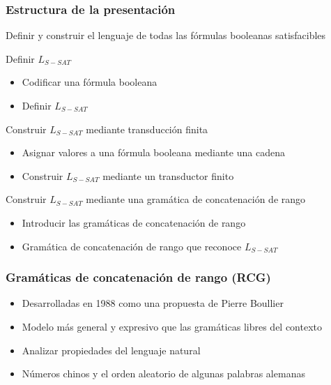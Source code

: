 \documentclass{beamer}
\begin{document}
\begin{frame}
    \frametitle{Estructura de la presentación}
    
    Definir y construir el lenguaje de todas las fórmulas booleanas satisfacibles   
    
    
    \begin{block}{Definir $L_{S-SAT}$}
        \begin{itemize}
            \item Codificar una fórmula booleana
            \item Definir $L_{S-SAT}$
        \end{itemize}
    \end{block}
    
    \begin{block}{Construir $L_{S-SAT}$ mediante transducción finita}
        \begin{itemize}
            \item Asignar valores a una fórmula booleana mediante una cadena
            \item Construir $L_{S-SAT}$ mediante un transductor finito
        \end{itemize}
    \end{block}
    
    
    \begin{block}{Construir $L_{S-SAT}$ mediante una gramática de concatenación de rango}
        \begin{itemize}
            \item Introducir las gramáticas de concatenación de rango
            \item Gramática de concatenación de rango que reconoce $L_{S-SAT}$
        \end{itemize}
    \end{block}
\end{frame}

\begin{frame}
    \frametitle{Gramáticas de concatenación de rango (RCG)}
    
    \begin{itemize}
        \item Desarrolladas  en 1988 como una propuesta de Pierre Boullier
              \pause
        \item Modelo más general y expresivo que las gramáticas libres del contexto
              \pause
        \item Analizar propiedades del lenguaje natural
              \pause
        \item Números chinos y el orden aleatorio de algunas palabras alemanas
    \end{itemize}
\end{frame}
\end{document}
